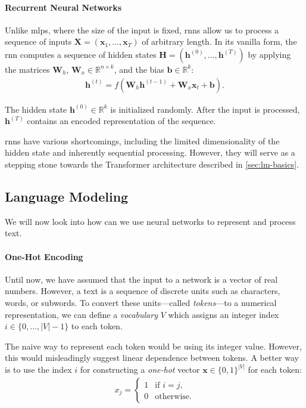 \paragraph{Recurrent Neural Networks} Unlike \acp{mlp}, where the size of the input is fixed, \acp{rnn} allow us to process a sequence of inputs $\mathbf{X} = (\mathbf{x}_1, \ldots, \mathbf{x}_T)$ of arbitrary length. In its vanilla form, the \ac{rnn} computes a sequence of hidden states $\mathbf{H} = (\mathbf{h}^{(0)}, \ldots, \mathbf{h}^{(T)})$ by applying the matrices $\mathbf{W}_h$, $\mathbf{W}_x \in \mathbb{R}^{n\times k}$, and the bias $\mathbf{b} \in \mathbb{R}^{k}$:
\begin{align}
    \mathbf{h}^{(t)} = f(\mathbf{W}_h \mathbf{h}^{(t-1)} + \mathbf{W}_x \mathbf{x}_t + \mathbf{b}).
\end{align}

The hidden state $\mathbf{h}^{(0)} \in \mathbb{R}^k$ is initialized randomly. After the input is processed, $\mathbf{h}^{(T)}$ contains an encoded representation of the sequence.

\acp{rnn} have various shortcomings, including the limited dimensionality of the hidden state and inherently sequential processing. However, they will serve as a stepping stone towards the Transformer architecture described in \autoref{sec:lm-basics}.


\subsection{Language Modeling}
\label{sec:lm-basics}
We will now look into how can we use neural networks to represent and process text.


\paragraph{One-Hot Encoding} Until now, we have assumed that the input to a network is a vector of real numbers. However, a text is a sequence of discrete units such as characters, words, or subwords. To convert these units---called \textit{tokens}---to a numerical representation, we can define a \textit{vocabulary} $V$ which assigns an integer index $i \in \{0, \ldots, |V|-1\}$ to each token.

The naive way to represent each token would be using its integer value. However, this would misleadingly suggest linear dependence between tokens. A better way is to use the index $i$ for constructing a \textit{one-hot} vector $\mathbf{x} \in \{0,1\}^{|V|} $ for each token:
\begin{align}
    x_j = \begin{cases}
        1 & \text{if } i = j, \\
        0 & \text{otherwise}.
    \end{cases}
\end{align}

